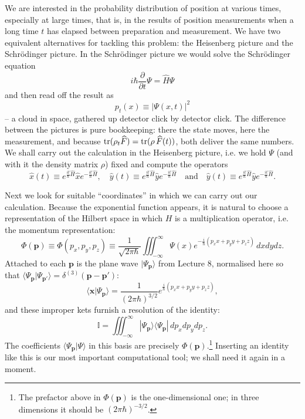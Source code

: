 We are interested in the probability distribution of position at various times, especially at large times, that is, in the results of
position measurements when a long time $t$ has elapsed between preparation and measurement. We have two equivalent alternatives for tackling this problem: the Heisenberg picture and the Schrödinger picture. In the Schrödinger picture we would solve the Schrödinger equation 
\begin{equation}
	i\hbar \frac{\partial}{\partial t}\Psi = \widehat{H}\Psi
\end{equation}
and then read off the result as 
\begin{equation}
	p_t(x) \equiv |\Psi(x,t)|^2
\end{equation}
-- a cloud in space, gathered up detector click by detector click. The difference between the pictures is pure bookkeeping: there the state moves, here the measurement, and because $\operatorname{tr}(\rho_t\widehat{F}) = \operatorname{tr}(\rho\,\widehat{F}(t))$, both deliver the same numbers. We shall carry out the calculation in the Heisenberg picture, i.e. we hold $\Psi$ (and with it
the density matrix $\rho$) fixed and compute the operators
\begin{equation}
	\widehat{x}(t) \equiv e^{\frac{it}{\hbar} \widehat{H}}\widehat{x} e^{-\frac{it}{\hbar} \widehat{H}}, \quad \widehat{y}(t) \equiv e^{\frac{it}{\hbar} \widehat{H}}\widehat{y} e^{-\frac{it}{\hbar} \widehat{H}} \quad \text{and} \quad \widehat{y}(t) \equiv e^{\frac{it}{\hbar} \widehat{H}}\widehat{y} e^{-\frac{it}{\hbar} \widehat{H}}.
\end{equation}

Next we look for suitable ``coordinates'' in which we can carry out our calculation. Because the exponential function appears, it is natural to choose a representation of the Hilbert space in which $H$ is a multiplication operator, i.e. the momentum representation:
\begin{equation}
	\Phi(\mathbf{p})\equiv \Phi(p_x,p_y,p_z) \equiv \frac{1}{\sqrt{2\pi\hbar}} \iiint_{-\infty}^\infty \Psi(x)e^{-\frac{i}{\hbar}(p_x x+ p_y y+ p_z z)}\,dxdydz.	
\end{equation} 
Attached to each $\mathbf{p}$ is the plane wave $|\Psi_{\mathbf{p}}\rangle$ from Lecture 8, normalised here so that $\langle\Psi_{\mathbf{p}}|\Psi_{\mathbf{p}'}\rangle = \delta^{(3)}(\mathbf{p}-\mathbf{p}')$:
\begin{equation}
	\langle \mathbf{x}|\Psi_{\mathbf{p}}\rangle = \frac{1}{(2\pi\hbar)^{3/2}}e^{\frac{i}{\hbar}(p_x x + p_y y + p_z z)},
\end{equation}
and these improper kets furnish a resolution of the identity:
\begin{equation}\label{eq:eins-impuls}
	\mathbb{I} = \iiint_{-\infty}^\infty |\Psi_{\mathbf{p}}\rangle\langle\Psi_{\mathbf{p}}|\,dp_xdp_ydp_z.
\end{equation}
The coefficients $\langle\Psi_{\mathbf{p}}|\Psi\rangle$ in this basis are precisely $\Phi(\mathbf{p})$.\footnote{The prefactor above in $\Phi(\mathbf{p})$ is the one-dimensional one; in three dimensions it should be $(2\pi\hbar)^{-3/2}$.} Inserting an identity like this is our most important computational tool; we shall need it again in a moment.

